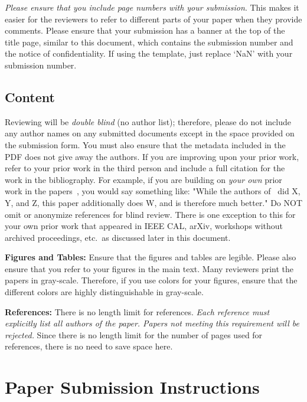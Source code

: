 \documentclass[conference]{IEEEtran}
\begin{document}
{\em Please ensure that you include page numbers with your
  submission}. This makes it easier for the reviewers to refer to
different parts of your paper when they provide comments. Please
ensure that your submission has a banner at the top of the title page,
similar to this document, which contains the submission number and the
notice of confidentiality.  If using the template, just replace `NaN'
with your submission number. 

\subsection{Content}
Reviewing will be {\em double blind} (no author list); therefore,
please do not include any author names on any submitted documents
except in the space provided on the submission form.  You must also
ensure that the metadata included in the PDF does not give away the
authors. If you are improving upon your prior work, refer to your
prior work in the third person and include a full citation for the
work in the bibliography.  For example, if you are building on {\em
  your own} prior work in the
papers~\cite{nicepaper1,nicepaper2,nicepaper3}, you would say
something like: "While the authors of~\cite{nicepaper1,nicepaper2,nicepaper3} did X,
Y, and Z, this paper additionally does W, and is therefore much
better."  Do NOT omit or anonymize references for blind review.  There
is one exception to this for your own prior work that appeared in IEEE
CAL, arXiv, workshops without archived proceedings, etc.\ as
discussed later in this document. 

\noindent\textbf{Figures and Tables:} Ensure that the figures and
tables are legible.  Please also ensure that you refer to your figures
in the main text.  Many reviewers print the papers in
gray-scale. Therefore, if you use colors for your figures, ensure that
the different colors are highly distinguishable in gray-scale. 

\noindent\textbf{References:}  There is no length limit for
references. {\em Each reference must explicitly list all authors of
  the paper.  Papers not meeting this requirement will be rejected.}
Since there is no length limit for the number of pages
used for references, there is no need to save space here. 


\section{Paper Submission Instructions}
\end{document}
